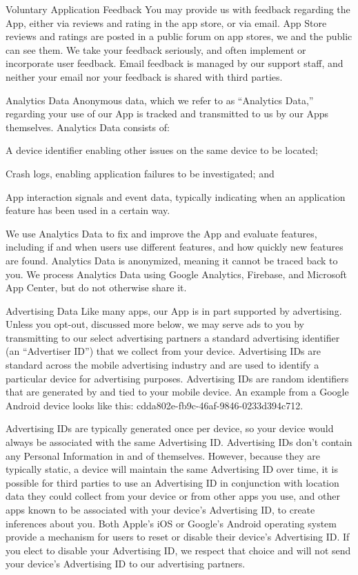 Voluntary Application Feedback
You may provide us with feedback regarding the App, either via reviews and rating in the app store, or via email. App Store reviews and ratings are posted in a public forum on app stores, we and the public can see them.  We take your feedback seriously, and often implement or incorporate user feedback. Email feedback is managed by our support staff, and neither your email nor your feedback is shared with third parties. 

Analytics Data
Anonymous data, which we refer to as “Analytics Data,” regarding your use of our App is tracked and transmitted to us by our Apps themselves. Analytics Data consists of:

A device identifier enabling other issues on the same device to be located;

Crash logs, enabling application failures to be investigated; and

App interaction signals and event data, typically indicating when an application feature has been used in a certain way.

We use Analytics Data to fix and improve the App and evaluate features, including if and when users use different features, and how quickly new features are found. Analytics Data is anonymized, meaning it cannot be traced back to you. We process Analytics Data using Google Analytics, Firebase, and Microsoft App Center, but do not otherwise share it.

Advertising Data
Like many apps, our App is in part supported by advertising. Unless you opt-out, discussed more below, we may serve ads to you by transmitting to our select advertising partners a standard advertising identifier (an “Advertiser ID”) that we collect from your device. Advertising IDs are standard across the mobile advertising industry and are used to identify a particular device for advertising purposes. Advertising IDs are random identifiers that are generated by and tied to your mobile device. An example from a Google Android device looks like this: cdda802e-fb9c-46af-9846-0233d394c712. 

Advertising IDs are typically generated once per device, so your device would always be associated with the same Advertising ID. Advertising IDs don’t contain any Personal Information in and of themselves. However, because they are typically static, a device will maintain the same Advertising ID over time, it is possible for third parties to use an Advertising ID in conjunction with location data they could collect from your device or from other apps you use, and other apps known to be associated with your device’s Advertising ID, to create inferences about you. Both Apple’s iOS or Google’s Android operating system provide a mechanism for users to reset or disable their device’s Advertising ID. If you elect to disable your Advertising ID, we respect that choice and will not send your device’s Advertising ID to our advertising partners.  

